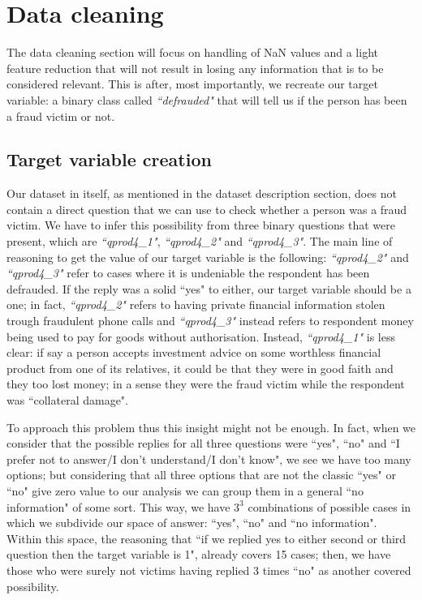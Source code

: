 \documentclass[a4paper,11pt]{article}
\begin{document}
\section{Data cleaning}
The data cleaning section will focus on handling of NaN values and a light feature reduction that will not result in losing any information that is to be considered relevant. This is after, most importantly, we recreate our target variable: a binary class called \textit{``defrauded"} that will tell us if the person has been a fraud victim or not. 
\subsection{Target variable creation}
Our dataset in itself, as mentioned in the dataset description section, does not contain a direct question that we can use to check whether a person was a fraud victim. We have to infer this possibility from three binary questions that were present, which are \textit{``qprod4\_1"}, \textit{``qprod4\_2"} and \textit{``qprod4\_3"}. 
The main line of reasoning to get the value of our target variable is the following: \textit{``qprod4\_2"} and \textit{``qprod4\_3"} refer to cases where it is undeniable the respondent has been defrauded. If the reply was a solid ``yes" to either, our target variable should be a one; in fact, \textit{``qprod4\_2"} refers to having private financial information stolen trough fraudulent phone calls and \textit{``qprod4\_3"} instead refers to respondent money being used to pay for goods without authorisation. Instead, \textit{``qprod4\_1"} is less clear: if say a person accepts investment advice on some worthless financial product from one of its relatives, it could be that they were in good faith and they too lost money; in a sense they were the fraud victim while the respondent was ``collateral damage". 

To approach this problem thus this insight might not be enough. In fact, when we consider that the possible replies for all three questions were ``yes", ``no" and ``I prefer not to answer/I don't understand/I don't know", we see we have too many options; but considering that all three options that are not the classic ``yes" or ``no" give zero value to our analysis we can group them in a general ``no information" of some sort. This way, we have $3^3$ combinations of possible cases in which we subdivide our space of answer: ``yes", ``no" and ``no information". Within this space, the reasoning that ``if we replied yes to either second or third question then the target variable is 1", already covers 15 cases; then, we have those who were surely not victims having replied 3 times ``no" as another covered possibility. 
\end{document}
